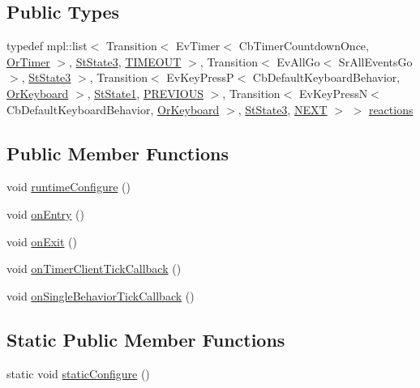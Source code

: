 \subsection*{Public Types}
\begin{DoxyCompactItemize}
\item 
typedef mpl\+::list$<$ Transition$<$ Ev\+Timer$<$ Cb\+Timer\+Countdown\+Once, \hyperlink{classsm__three__some_1_1OrTimer}{Or\+Timer} $>$, \hyperlink{structsm__three__some_1_1StState3}{St\+State3}, \hyperlink{structsm__three__some_1_1StState2_1_1TIMEOUT}{T\+I\+M\+E\+O\+UT} $>$, Transition$<$ Ev\+All\+Go$<$ Sr\+All\+Events\+Go $>$, \hyperlink{structsm__three__some_1_1StState3}{St\+State3} $>$, Transition$<$ Ev\+Key\+PressP$<$ Cb\+Default\+Keyboard\+Behavior, \hyperlink{classsm__three__some_1_1OrKeyboard}{Or\+Keyboard} $>$, \hyperlink{structsm__three__some_1_1StState1}{St\+State1}, \hyperlink{structsm__three__some_1_1StState2_1_1PREVIOUS}{P\+R\+E\+V\+I\+O\+US} $>$, Transition$<$ Ev\+Key\+PressN$<$ Cb\+Default\+Keyboard\+Behavior, \hyperlink{classsm__three__some_1_1OrKeyboard}{Or\+Keyboard} $>$, \hyperlink{structsm__three__some_1_1StState3}{St\+State3}, \hyperlink{structsm__three__some_1_1StState2_1_1NEXT}{N\+E\+XT} $>$ $>$ \hyperlink{structsm__three__some_1_1StState2_a882f17a676c2edc41d5e3a76c5255c87}{reactions}
\end{DoxyCompactItemize}
\subsection*{Public Member Functions}
\begin{DoxyCompactItemize}
\item 
void \hyperlink{structsm__three__some_1_1StState2_aab0c27caa0d5a70c644ee1ec0830ba15}{runtime\+Configure} ()
\item 
void \hyperlink{structsm__three__some_1_1StState2_ac117bcbd7f1afe6ea699109923795b50}{on\+Entry} ()
\item 
void \hyperlink{structsm__three__some_1_1StState2_af1c453aa52e2117b3a059ae11625963b}{on\+Exit} ()
\item 
void \hyperlink{structsm__three__some_1_1StState2_a489156949b0f8f08fc7e32850154ded8}{on\+Timer\+Client\+Tick\+Callback} ()
\item 
void \hyperlink{structsm__three__some_1_1StState2_ac24b22f90d939c7207ca75e82344a5ef}{on\+Single\+Behavior\+Tick\+Callback} ()
\end{DoxyCompactItemize}
\subsection*{Static Public Member Functions}
\begin{DoxyCompactItemize}
\item 
static void \hyperlink{structsm__three__some_1_1StState2_af07ae40962e343ce9605288f0ebad82b}{static\+Configure} ()
\end{DoxyCompactItemize}
